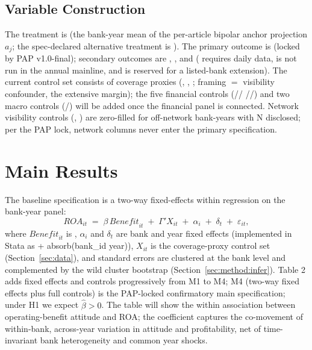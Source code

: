 \subsection{Variable Construction}
The treatment is  (the bank-year mean of the
per-article bipolar anchor projection $a_j$; the spec-declared
alternative treatment is ). The primary
outcome is  (locked by PAP v1.0-final); secondary outcomes
are , , and
 ( requires daily data, is
not run in the annual mainline, and is reserved for a listed-bank
extension). The current control set consists of coverage proxies
(, , ;
framing $=$ visibility confounder, the extensive margin); the five
financial controls (//
//) and two
macro controls (/) will be added
once the financial panel is connected. Network visibility controls
(, ) are zero-filled
for off-network bank-years with N disclosed; per the PAP lock, network
columns never enter the primary specification.

\section{Main Results}\label{sec:main}
The baseline specification is a two-way fixed-effects within regression
on the bank-year panel:
\begin{equation}\label{eq:baseline}
\mathit{ROA}_{it} \;=\; \beta\,\mathit{Benefit}_{it} \;+\; \Gamma' X_{it}
\;+\; \alpha_i \;+\; \delta_t \;+\; \varepsilon_{it},
\end{equation}
where $\mathit{Benefit}_{it}$ is ,
$\alpha_i$ and $\delta_t$ are bank and year fixed effects (implemented
in Stata as  + absorb(bank\_id year)), $X_{it}$ is the
coverage-proxy control set (Section~\ref{sec:data}), and standard
errors are clustered at the bank level and complemented by the wild
cluster bootstrap (Section~\ref{sec:method:infer}). Table 2 adds fixed
effects and controls progressively from M1 to M4; M4 (two-way fixed
effects plus full controls) is the PAP-locked confirmatory main
specification; under H1 we expect $\hat\beta > 0$. The table will show
the within association between operating-benefit attitude and ROA; the
coefficient captures the co-movement of within-bank, across-year
variation in attitude and profitability, net of time-invariant bank
heterogeneity and common year shocks.

